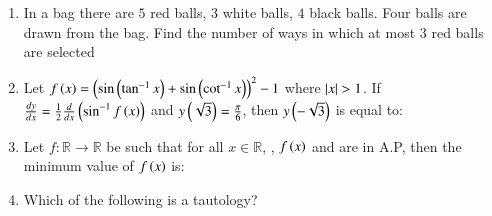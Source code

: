\documentclass[journal,12pt,onecolumn]{IEEEtran}
\theoremstyle{remark}
\begin{document}
\begin{enumerate}
\item In a bag there are $5$ red balls, $3$ white balls, $4$ black balls. Four balls are drawn from the bag. Find the number of ways in which at most $3$ red balls are selected

\hfill{}
\begin{enumerate}
\end{enumerate}

\item Let $f\left(x\right)=\left(\sin\left({\tan^{-1}x}\right)+\sin\left({\cot^{-1}x}\right)\right)^2-1$ where $\left\vert x\right\vert>1$. If $\frac{dy}{dx}=\frac{1}{2}\frac{d}{dx}\left(\sin^{-1}f\left(x\right)\right)$ and $y\left(\sqrt{3}\right)=\frac{\pi}{6}$, then $y\left(-\sqrt{3}\right)$ is equal to:

\hfill{}
\begin{enumerate}
\end{enumerate}

\item Let $f:\mathbb{R}\rightarrow\mathbb{R}$ be such that for all $x\in\mathbb{R}$, , $f\left(x\right)$ and  are in A.P, then the minimum value of $f\left(x\right)$ is:

\hfill{}
\begin{enumerate}
\end{enumerate}

\item Which of the following is a tautology?

\hfill{}
\begin{enumerate}
\end{enumerate}


\end{enumerate}
\end{document}
